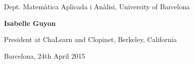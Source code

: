 {Dept. Matemàtica Aplicada i Anàlisi, University of Barcelona}


\medskip %

{\Large\bf Isabelle Guyon}

\medskip %

{President at ChaLearn and Clopinet, Berkeley, California}



\medskip\medskip\medskip\medskip\medskip

\begin{center}
{\Large Barcelona, 24th April 2015}
\end{center}


